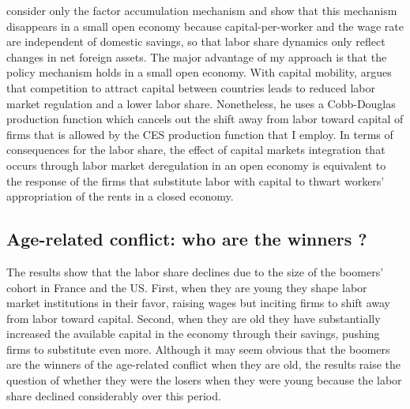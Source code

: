 \citet{Schmidt2013Demographic} consider only the factor accumulation mechanism and show that this mechanism disappears in a small open economy because capital-per-worker and the wage rate are independent of domestic savings, so that labor share dynamics only reflect changes in net foreign assets.
The major advantage of my approach is that the policy mechanism holds in a small open economy.
%
With capital mobility, \citet{Pica2010Capital} argues that competition to attract capital between countries leads to reduced labor market regulation and a lower labor share.
%
Nonetheless, he uses a Cobb-Douglas production function which cancels out the shift away from labor toward capital of firms that is allowed by the CES production function that I employ.
%
In terms of consequences for the labor share, the effect of capital markets integration that occurs through labor market deregulation in an open economy is equivalent to the response of the firms that substitute labor with capital to thwart workers' appropriation of the rents in a closed economy.

\subsection{Age-related conflict: who are the winners ?} \label{chap1-winners}

The results show that the labor share declines due to the size of the boomers' cohort in France and the US. First, when they are young they shape labor market institutions in their favor, raising wages but inciting firms to shift away from labor toward capital. Second, when they are old they have substantially increased the available capital in the economy through their savings, pushing firms to substitute even more. Although it may seem obvious that the boomers are the winners of the age-related conflict when they are old, the results raise the question of whether they were the losers when they were young because the labor share declined considerably over this period.

